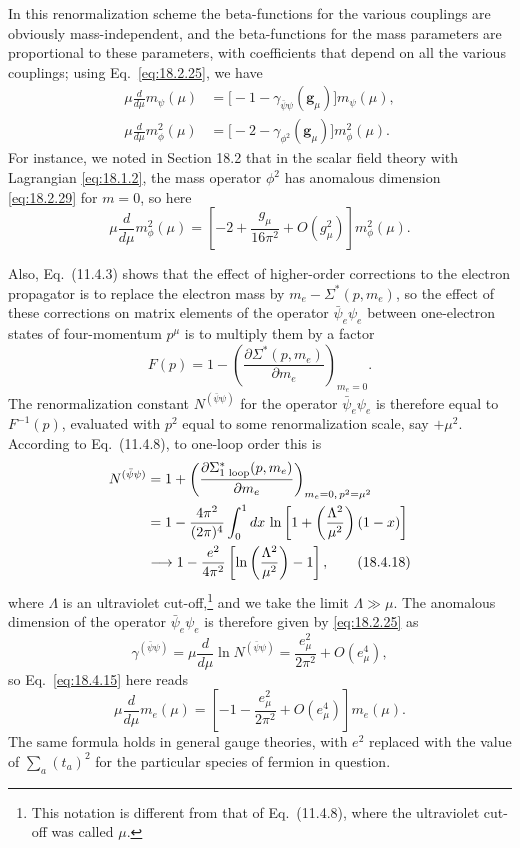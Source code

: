 In this renormalization scheme the beta-functions for the various couplings are obviously mass-independent, and the beta-functions for the mass parameters are proportional to these parameters, with coefficients that depend on all the various couplings; using Eq.~\eqref{eq:18.2.25}, we have
\begin{align}
\mu\frac{d}{d\mu}m_\psi(\mu)
&=\bigl[-1-\gamma_{\bar\psi\psi}(\mathbf{g}_\mu)\bigr]m_\psi(\mu),
\tag{18.4.15}\label{eq:18.4.15}\\
\mu\frac{d}{d\mu}m_\phi^2(\mu)
&=\bigl[-2-\gamma_{\phi^2}(\mathbf{g}_\mu)\bigr]m_\phi^2(\mu).
\tag{18.4.16}\label{eq:18.4.16}
\end{align}
For instance, we noted in Section 18.2 that in the scalar field theory with Lagrangian \eqref{eq:18.1.2}, the mass operator $\phi^2$ has anomalous dimension \eqref{eq:18.2.29} for $m=0$, so here
\begin{equation}
\mu\frac{d}{d\mu}m_\phi^2(\mu)
=\left[-2+\frac{g_\mu}{16\pi^2}+O(g_\mu^2)\right]m_\phi^2(\mu).
\tag{18.4.17}\label{eq:18.4.17}
\end{equation}

Also, Eq.~(11.4.3) shows that the effect of higher-order corrections to the electron propagator is to replace the electron mass by $m_e-\Sigma^*(p,m_e)$, so the effect of these corrections on matrix elements of the operator $\bar\psi_e\psi_e$ between one-electron states of four-momentum $p^\mu$ is to multiply them by a factor
\[
F(p)=1-\left(\frac{\partial\Sigma^*(p,m_e)}{\partial m_e}\right)_{m_e=0}.
\]
The renormalization constant $N^{(\bar\psi\psi)}$ for the operator $\bar\psi_e\psi_e$ is therefore equal to $F^{-1}(p)$, evaluated with $p^2$ equal to some renormalization scale, say $+\mu^2$. According to Eq.~(11.4.8), to one-loop order this is
\begin{align}
N^{(\bar\psi\psi)}
&=1+\left(\frac{\partial\Sigma^*_{\text{1 loop}}(p,m_e)}{\partial m_e}\right)_{m_e=0,\,p^2=\mu^2}
\notag\\
&=1-\frac{4\pi^2}{(2\pi)^4}\int_0^1 dx\,
\ln\left[1+\left(\frac{\Lambda^2}{\mu^2}\right)(1-x)\right]
\notag\\
&\longrightarrow 1-\frac{e^2}{4\pi^2}
\left[\ln\left(\frac{\Lambda^2}{\mu^2}\right)-1\right],
\tag{18.4.18}\label{eq:18.4.18}
\end{align}
where $\Lambda$ is an ultraviolet cut-off,\footnote{This notation is different from that of Eq.~(11.4.8), where the ultraviolet cut-off was called $\mu$.} and we take the limit $\Lambda\gg\mu$. The anomalous dimension of the operator $\bar\psi_e\psi_e$ is therefore given by \eqref{eq:18.2.25} as
\begin{equation}
\gamma^{(\bar\psi\psi)}=\mu\frac{d}{d\mu}\ln N^{(\bar\psi\psi)}
=\frac{e_\mu^2}{2\pi^2}+O(e_\mu^4),
\tag{18.4.19}\label{eq:18.4.19}
\end{equation}
so Eq.~\eqref{eq:18.4.15} here reads
\begin{equation}
\mu\frac{d}{d\mu}m_e(\mu)
=\left[-1-\frac{e_\mu^2}{2\pi^2}+O(e_\mu^4)\right]m_e(\mu).
\tag{18.4.20}\label{eq:18.4.20}
\end{equation}
The same formula holds in general gauge theories, with $e^2$ replaced with the value of $\sum_a(t_a)^2$ for the particular species of fermion in question.

